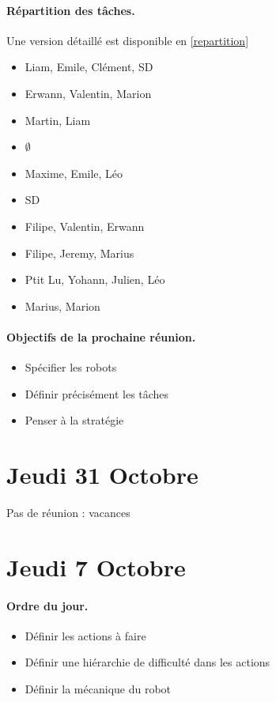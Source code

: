 \documentclass[a4paper,10pt]{report}
\theoremstyle{definition}
\begin{document}
\begin{spacing}{1.5}
\begin{multicols}{2}
\paragraph*{Répartition des tâches.}
Une version détaillé est disponible en \ref{repartition}
\begin{itemize}
\item Liam, Emile, Clément, SD
\item Erwann, Valentin, Marion
\item Martin, Liam
\item $\emptyset$
\item Maxime, Emile, Léo
\item SD
\item Filipe, Valentin, Erwann
\item Filipe, Jeremy, Marius
\item Ptit Lu, Yohann, Julien, Léo
\item Marius, Marion
\end{itemize}
\end{multicols}

\paragraph*{Objectifs de la prochaine réunion.}
\begin{itemize}
\item Spécifier les robots
\item Définir précisément les tâches
\item Penser à la stratégie
\end{itemize}

\newpage
\section*{Jeudi 31 Octobre}
Pas de réunion : vacances
\newpage
\section*{Jeudi 7 Octobre}
\paragraph*{Ordre du jour.}
\begin{itemize}
\item Définir les actions à faire
\item Définir une hiérarchie de difficulté dans les actions
\item Définir la mécanique du robot
\end{itemize}


\end{spacing}
\end{document}
